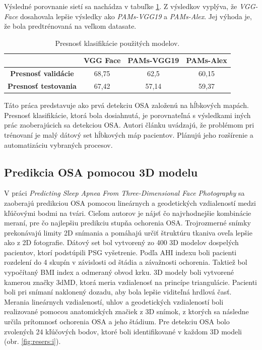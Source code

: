 Výsledné porovnanie sietí sa nachádza v tabuľke \ref{tab:resers:2}. Z výsledkov vyplýva, že \textit{VGG-Face} dosahovala lepšie výsledky ako \textit{PAMs-VGG19} a \textit{PAMs-Alex}. Jej výhoda je, že bola predtrénovaná na veľkom datasate. 

\begin{table}[H]
	\caption{\label{tab:resers:2} Presnosť klasifikácie použitých modelov. }
	\centering
	\begin{tabular}{cccc}
		\toprule
		\textbf{} & \textbf{VGG Face} & \textbf{PAMs-VGG19} & \textbf{PAMs-Alex}     \\ 
		\midrule
		\textbf{Presnosť validácie}		& 68,75		& 62,5		& 60,15		\\ 
		\textbf{Presnosť testovania}	& 67,42		& 57,14  	& 59,37		\\ 
		\bottomrule
	\end{tabular}
\end{table}

Táto práca predstavuje ako prvá detekciu OSA založenú na hĺbkových mapách. Presnosť klasifikácie, ktorá bola dosiahnutá, je porovnateľná s výsledkami iných prác zaoberajúcich sa detekciou OSA. Autori článku uvádzajú, že problémom pri trénovaní je malý dátový set hĺbkových máp pacientov. Plánujú jeho rozšírenie a automatizáciu vybraných procesov. 

\subsection{Predikcia OSA pomocou 3D modelu}

V práci \textit{Predicting Sleep Apnea From Three-Dimensional Face Photography} sa zaoberajú predikciou OSA pomocou lineárnych a geodetických vzdialeností medzi kľúčovými bodmi na tvári. Cieľom autorov je nájsť čo najvhodnejšie kombinácie meraní, pre čo najlepšiu predikciu stupňa ochorenia OSA. 
Trojrozmerné snímky prekonávajú limity 2D snímania a pomáhajú určiť štruktúru tkaniva oveľa lepšie ako z 2D fotografie. Dátový set bol vytvorený zo 400 3D modelov dospelých pacientov, ktorí podstúpili PSG vyšetrenie. Podľa AHI indexu boli pacienti rozdelení do 4 skupín v závislosti od štádia a závažnosti ochorenia. Taktiež bol vypočítaný BMI index a odmeraný obvod krku. 3D modely boli vytvorené kamerou značky 3dMD, ktorá meria vzdialenosť na princípe triangulácie. Pacienti boli pri snímaní naklonený dozadu, aby bola lepšie viditeľná hrdlová časť. Merania lineárnych vzdialeností, uhlov a geodetických vzdialeností boli realizované pomocou anatomických značiek z 3D snímok, z ktorých sa následne určila prítomnosť ochorenia OSA a jeho štádium. Pre detekciu OSA bolo zvolených 24 kľúčových bodov, ktoré boli identifikované v každom 3D modeli (obr. \ref{fig:resers:i}). 



